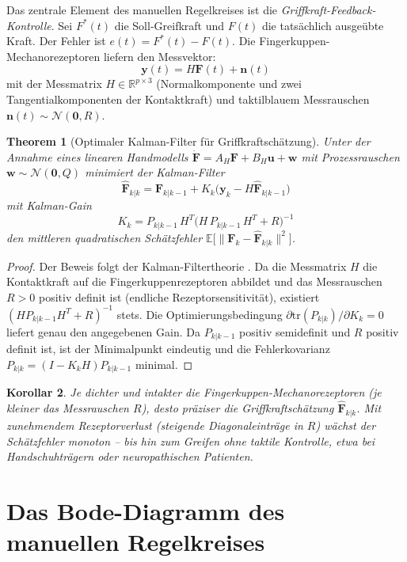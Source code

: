 ﻿\documentclass[12pt,a4paper]{report}
\theoremstyle{plain}
\newtheorem{theorem}{Theorem}[section]
\newtheorem{korollar}[theorem]{Korollar}
\theoremstyle{definition}
\theoremstyle{remark}
\begin{document}
Das zentrale Element des manuellen Regelkreises ist die
\emph{Griffkraft-Feedback-Kontrolle}. Sei $F^*(t)$ die Soll-Greifkraft
und $F(t)$ die tatsächlich ausgeübte Kraft. Der Fehler ist
$e(t) = F^*(t) - F(t)$. Die Fingerkuppen-Mechanorezeptoren liefern
den Messvektor:
\[
  \mathbf{y}(t) = H \mathbf{F}(t) + \mathbf{n}(t)
\]
mit der Messmatrix $H \in \mathbb{R}^{p \times 3}$ (Normalkomponente und
zwei Tangentialkomponenten der Kontaktkraft) und taktilblauem
Messrauschen $\mathbf{n}(t) \sim \mathcal{N}(\mathbf{0}, R)$.

\begin{theorem}[Optimaler Kalman-Filter für Griffkraftschätzung]
\label{thm:kalman}
Unter der Annahme eines linearen Handmodells
$\dot{\mathbf{F}} = A_H \mathbf{F} + B_H \mathbf{u} + \mathbf{w}$ mit
Prozessrauschen $\mathbf{w} \sim \mathcal{N}(\mathbf{0}, Q)$ minimiert
der Kalman-Filter
\[
  \hat{\mathbf{F}}_{k|k} = \hat{\mathbf{F}}_{k|k-1}
    + K_k \bigl(\mathbf{y}_k - H \hat{\mathbf{F}}_{k|k-1}\bigr)
\]
mit Kalman-Gain
\[
  K_k = P_{k|k-1}\, H^T \bigl(H\, P_{k|k-1}\, H^T + R\bigr)^{-1}
\]
den mittleren quadratischen Schätzfehler
$\mathbb{E}\bigl[\|\mathbf{F}_k - \hat{\mathbf{F}}_{k|k}\|^2\bigr]$.
\end{theorem}

\begin{proof}
Der Beweis folgt der Kalman-Filtertheorie \cite{kalman1960}.
Da die Messmatrix $H$ die Kontaktkraft auf die Fingerkuppenrezeptoren
abbildet und das Messrauschen $R > 0$ positiv definit ist (endliche
Rezeptorsensitivität), existiert $(HP_{k|k-1}H^T + R)^{-1}$ stets.
Die Optimierungsbedingung $\partial \text{tr}(P_{k|k})/\partial K_k = 0$
liefert genau den angegebenen Gain. Da $P_{k|k-1}$ positiv semidefinit
und $R$ positiv definit ist, ist der Minimalpunkt eindeutig und die
Fehlerkovarianz $P_{k|k} = (I - K_k H) P_{k|k-1}$ minimal.
\end{proof}

\begin{korollar}
\label{kor:rezeptorverlust}
Je dichter und intakter die Fingerkuppen-Mechanorezeptoren (je kleiner
das Messrauschen $R$), desto präziser die Griffkraftschätzung
$\hat{\mathbf{F}}_{k|k}$. Mit zunehmendem Rezeptorverlust (steigende
Diagonaleinträge in $R$) wächst der Schätzfehler monoton -- bis hin
zum Greifen ohne taktile Kontrolle, etwa bei Handschuhträgern oder
neuropathischen Patienten.
\end{korollar}

\section{Das Bode-Diagramm des manuellen Regelkreises}
\end{document}
